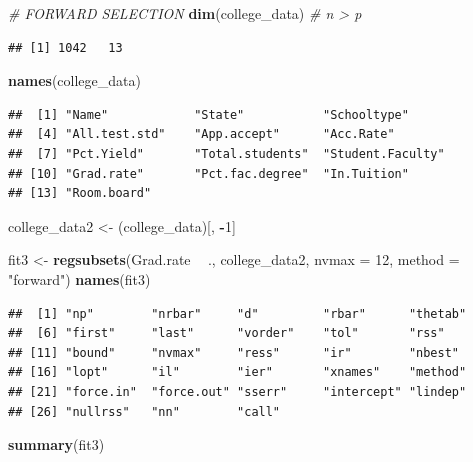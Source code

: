 \documentclass[]{article}
\newenvironment{Shaded}{\begin{snugshade}}{\end{snugshade}}
\newcommand{\KeywordTok}[1]{\textcolor[rgb]{0.13,0.29,0.53}{\textbf{#1}}}
\newcommand{\DataTypeTok}[1]{\textcolor[rgb]{0.13,0.29,0.53}{#1}}
\newcommand{\DecValTok}[1]{\textcolor[rgb]{0.00,0.00,0.81}{#1}}
\newcommand{\StringTok}[1]{\textcolor[rgb]{0.31,0.60,0.02}{#1}}
\newcommand{\CommentTok}[1]{\textcolor[rgb]{0.56,0.35,0.01}{\textit{#1}}}
\newcommand{\OperatorTok}[1]{\textcolor[rgb]{0.81,0.36,0.00}{\textbf{#1}}}
\newcommand{\NormalTok}[1]{#1}
\begin{document}
\begin{Shaded}
\begin{Highlighting}[]
\CommentTok{# FORWARD SELECTION}
\KeywordTok{dim}\NormalTok{(college_data)  }\CommentTok{# n > p}
\end{Highlighting}
\end{Shaded}

\begin{verbatim}
## [1] 1042   13
\end{verbatim}

\begin{Shaded}
\begin{Highlighting}[]
\KeywordTok{names}\NormalTok{(college_data)}
\end{Highlighting}
\end{Shaded}

\begin{verbatim}
##  [1] "Name"            "State"           "Schooltype"     
##  [4] "All.test.std"    "App.accept"      "Acc.Rate"       
##  [7] "Pct.Yield"       "Total.students"  "Student.Faculty"
## [10] "Grad.rate"       "Pct.fac.degree"  "In.Tuition"     
## [13] "Room.board"
\end{verbatim}

\begin{Shaded}
\begin{Highlighting}[]
\NormalTok{college_data2 <-}\StringTok{ }\NormalTok{(college_data)[, }\OperatorTok{-}\DecValTok{1}\NormalTok{]}

\NormalTok{fit3 <-}\StringTok{ }\KeywordTok{regsubsets}\NormalTok{(Grad.rate }\OperatorTok{~}\StringTok{ }\NormalTok{., college_data2, }\DataTypeTok{nvmax =} \DecValTok{12}\NormalTok{, }\DataTypeTok{method =} \StringTok{"forward"}\NormalTok{)}
\KeywordTok{names}\NormalTok{(fit3)}
\end{Highlighting}
\end{Shaded}

\begin{verbatim}
##  [1] "np"        "nrbar"     "d"         "rbar"      "thetab"   
##  [6] "first"     "last"      "vorder"    "tol"       "rss"      
## [11] "bound"     "nvmax"     "ress"      "ir"        "nbest"    
## [16] "lopt"      "il"        "ier"       "xnames"    "method"   
## [21] "force.in"  "force.out" "sserr"     "intercept" "lindep"   
## [26] "nullrss"   "nn"        "call"
\end{verbatim}

\begin{Shaded}
\begin{Highlighting}[]
\KeywordTok{summary}\NormalTok{(fit3)}
\end{Highlighting}
\end{Shaded}
\end{document}
